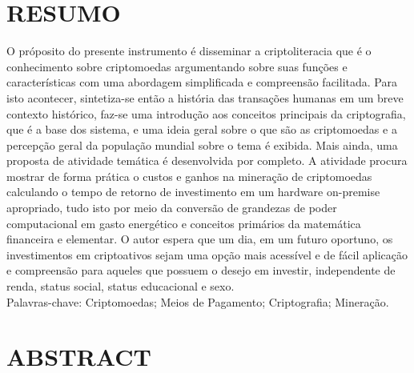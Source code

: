

\begin{KeepFromToc}
 \chapter*{RESUMO}


O próposito do presente instrumento é disseminar a criptoliteracia que é o conhecimento sobre criptomoedas argumentando sobre suas funções e características com uma abordagem simplificada e compreensão facilitada. Para isto acontecer, sintetiza-se então a história das transações humanas em um breve contexto histórico, faz-se uma introdução aos conceitos principais da criptografia, que é a base dos sistema, e uma ideia geral sobre o que são as criptomoedas e a percepção geral da população mundial sobre o tema é exibida. Mais ainda, uma proposta de atividade temática é desenvolvida por completo. A atividade procura mostrar de forma prática o custos e ganhos na mineração de criptomoedas calculando o tempo de retorno de investimento em um hardware on-premise apropriado, tudo isto por meio da conversão de grandezas de poder computacional em gasto energético e conceitos primários da matemática financeira e elementar. O autor espera que um dia, em um futuro oportuno, os investimentos em criptoativos sejam uma opção mais acessível e de fácil aplicação e compreensão para aqueles que possuem o desejo em investir, independente de renda, status social, status educacional e sexo. \\

\noindent
Palavras-chave: Criptomoedas; Meios de Pagamento; Criptografia; Mineração.

\vspace{2cm}


\chapter*{ABSTRACT}


\end{KeepFromToc}
